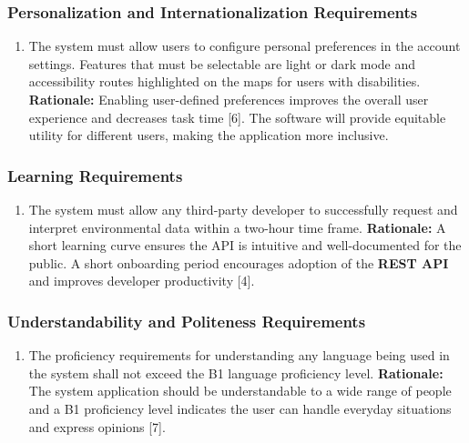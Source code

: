 \documentclass[]{article}
\begin{document}
\subsubsection{Personalization and Internationalization Requirements}
\label{ssub:personalization_and_internationalization_requirements}
\begin{enumerate}[{UH-PI}1. ]
	\item The system must allow users to configure personal preferences in the account settings. Features that must be selectable are light or dark mode and accessibility routes highlighted on the maps for users with disabilities.\newline
	{\bf Rationale:} Enabling user-defined preferences improves the overall user experience and decreases task time [6]. The software will provide equitable utility for different users, making the application more inclusive.
\end{enumerate}

\subsubsection{Learning Requirements}
\label{ssub:learning_requirements}
\begin{enumerate}[{UH-L}1. ]
	\item The system must allow any third-party developer to successfully request and interpret environmental data within a two-hour time frame.\newline
	{\bf Rationale:} A short learning curve ensures the API is intuitive and well-documented for the public. A short onboarding period encourages adoption of the \textbf{REST API} and improves developer productivity [4].
\end{enumerate}

\subsubsection{Understandability and Politeness Requirements}
\label{ssub:understandability_and_politeness_requirements}
\begin{enumerate}[{UH-UP}1. ]
	\item The proficiency requirements for understanding any language being used in the system shall not exceed the B1 language proficiency level.\newline
	{\bf Rationale:} The system application should be understandable to a wide range of people and a B1 proficiency level indicates the user can handle everyday situations and express opinions [7].
\end{enumerate}
\end{document}
